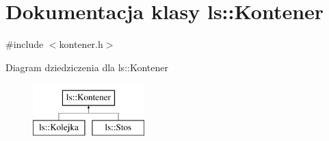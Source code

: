 \hypertarget{classls_1_1_kontener}{\section{Dokumentacja klasy ls\-:\-:Kontener}
\label{classls_1_1_kontener}
}


{\ttfamily \#include $<$kontener.\-h$>$}

Diagram dziedziczenia dla ls\-:\-:Kontener\begin{figure}[H]
\begin{center}
\leavevmode
\includegraphics[height=2.000000cm]{classls_1_1_kontener}
\end{center}
\end{figure}
